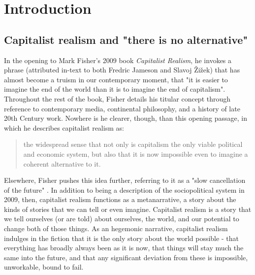 \chapter{Introduction}
\label{ch:1}

\section{Capitalist realism and "there is no alternative"}
\label{sec:1-1}

In the opening to Mark Fisher's 2009 book \emph{Capitalist Realism}, he invokes a phrase (attributed in-text to both Fredric Jameson and Slavoj Žižek) that has almost become a truism in our contemporary moment, that "it is easier to imagine the end of the world than it is to imagine the end of capitalism". Throughout the rest of the book, Fisher details his titular concept through reference to contemporary media, continental philosophy, and a history of late 20th Century work. Nowhere is he clearer, though, than this opening passage, in which he describes capitalist realism as:
\begin{quote}
the widespread sense that not only is capitalism the only viable political and economic system, but also that it is now impossible even to imagine a coherent alternative to it. \citep{fisher_capitalist_2009}
\end{quote}
Elsewhere, Fisher pushes this idea further, referring to it as a "slow cancellation of the future" \citep[5]{fisher_ghosts_2014}. In addition to being a description of the sociopolitical system in 2009, then, capitalist realism functions as a metanarrative, a story about the kinds of stories that we can tell or even imagine. Capitalist realism is a story that we tell ourselves (or are told) about ourselves, the world, and our potential to change both of those things. As an hegemonic narrative, capitalist realism indulges in the fiction that it is the only story about the world possible - that everything has broadly always been as it is now, that things will stay much the same into the future, and that any significant deviation from these is impossible, unworkable, bound to fail. 


